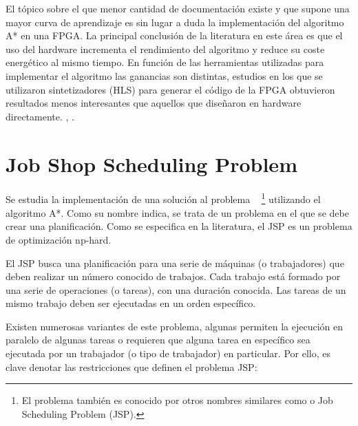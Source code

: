 El tópico sobre el que menor cantidad de documentación existe
y que supone una mayor curva de aprendizaje es sin lugar a duda
la implementación del algoritmo A* en una FPGA.
La principal conclusión de la literatura en este área es
que el uso del hardware incrementa el rendimiento del
algoritmo y reduce su coste energético al mismo tiempo.
En función de las herramientas utilizadas para implementar
el algoritmo las ganancias son distintas,
estudios en los que se utilizaron sintetizadores (HLS)
para generar el código de la FPGA obtuvieron resultados
menos interesantes que aquellos que diseñaron en hardware
directamente.
\cite{ZJW20}, \cite{NSG17}.

\pagebreak

\section{Job Shop Scheduling Problem}

Se estudia la implementación de una solución al problema
~\cite{Yan77}
\footnote{El problema también es conocido por otros nombres similares
como  o Job Scheduling Problem (JSP).}
utilizando el algoritmo A*.
Como su nombre indica, se trata de un problema en el que se debe
crear una planificación.
Como se especifica en la literatura, el JSP es un problema de optimización np-hard.

El JSP busca una planificación para una serie de
máquinas (o trabajadores) que deben realizar un número conocido
de trabajos.
Cada trabajo está formado por una serie de operaciones (o tareas),
con una duración conocida.
Las tareas de un mismo trabajo deben ser ejecutadas en un orden específico.

Existen numerosas variantes de este problema,
algunas permiten la ejecución
en paralelo de algunas tareas o requieren que alguna tarea
en específico sea ejecutada por un trabajador (o tipo de trabajador)
en particular.
Por ello, es clave denotar las restricciones que definen el problema JSP\@:

